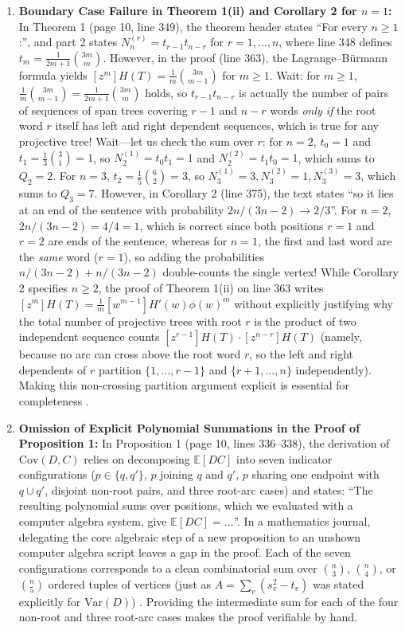\documentclass[11pt,a4paper]{article}
\begin{document}
\begin{enumerate}[label=\textbf{Issue \arabic*:}, wide, labelwidth=!, labelindent=0pt]
    \item \textbf{Boundary Case Failure in Theorem 1(ii) and Corollary 2 for $n=1$:}
    In Theorem 1 (page 10, line 349), the theorem header states ``For every $n \ge 1$:'', and part 2 states $N_n^{(r)} = t_{r-1}t_{n-r}$ for $r=1,\dots,n$, where line 348 defines $t_m = \frac{1}{2m+1}\binom{3m}{m}$. However, in the proof (line 363), the Lagrange--B\"urmann formula yields $[z^m]H(T) = \frac{1}{m}\binom{3m}{m-1}$ for $m \ge 1$. Wait: for $m \ge 1$, $\frac{1}{m}\binom{3m}{m-1} = \frac{1}{2m+1}\binom{3m}{m}$ holds, so $t_{r-1}t_{n-r}$ is actually the number of pairs of sequences of span trees covering $r-1$ and $n-r$ words \emph{only if} the root word $r$ itself has left and right dependent sequences, which is true for any projective tree! Wait—let us check the sum over $r$: for $n=2$, $t_0 = 1$ and $t_1 = \frac{1}{3}\binom{3}{1} = 1$, so $N_2^{(1)} = t_0 t_1 = 1$ and $N_2^{(2)} = t_1 t_0 = 1$, which sums to $Q_2 = 2$. For $n=3$, $t_2 = \frac{1}{5}\binom{6}{2} = 3$, so $N_3^{(1)} = 3, N_3^{(2)} = 1, N_3^{(3)} = 3$, which sums to $Q_3 = 7$. However, in Corollary 2 (line 375), the text states ``so it lies at an end of the sentence with probability $2n/(3n-2) \to 2/3$''. For $n=2$, $2n/(3n-2) = 4/4 = 1$, which is correct since both positions $r=1$ and $r=2$ are ends of the sentence, whereas for $n=1$, the first and last word are the \emph{same} word ($r=1$), so adding the probabilities $n/(3n-2) + n/(3n-2)$ double-counts the single vertex! While Corollary 2 specifies $n \ge 2$, the proof of Theorem 1(ii) on line 363 writes $[z^m]H(T) = \frac{1}{m}[w^{m-1}]H'(w)\phi(w)^m$ without explicitly justifying why the total number of projective trees with root $r$ is the product of two independent sequence counts $[z^{r-1}]H(T) \cdot [z^{n-r}]H(T)$ (namely, because no arc can cross above the root word $r$, so the left and right dependents of $r$ partition $\{1,\dots,r-1\}$ and $\{r+1,\dots,n\}$ independently). Making this non-crossing partition argument explicit is essential for completeness \cite{Flajolet2009}.

    \item \textbf{Omission of Explicit Polynomial Summations in the Proof of Proposition 1:}
    In Proposition 1 (page 10, lines 336--338), the derivation of $\mathrm{Cov}(D,C)$ relies on decomposing $\mathbb{E}[DC]$ into seven indicator configurations ($p \in \{q, q'\}$, $p$ joining $q$ and $q'$, $p$ sharing one endpoint with $q \cup q'$, disjoint non-root pairs, and three root-arc cases) and states: ``The resulting polynomial sums over positions, which we evaluated with a computer algebra system, give $\mathbb{E}[DC] = \dots$''. In a mathematics journal, delegating the core algebraic step of a new proposition to an unshown computer algebra script leaves a gap in the proof. Each of the seven configurations corresponds to a clean combinatorial sum over $\binom{n}{3}$, $\binom{n}{4}$, or $\binom{n}{5}$ ordered tuples of vertices (just as $A = \sum_v (s_v^2 - t_v)$ was stated explicitly for $\mathrm{Var}(D)$) \cite{Graham1994}. Providing the intermediate sum for each of the four non-root and three root-arc cases makes the proof verifiable by hand.


\end{enumerate}
\end{document}
